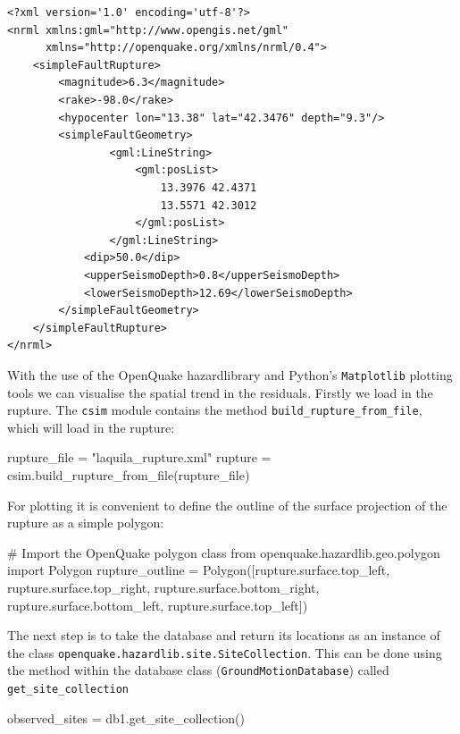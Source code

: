\begin{verbatim}
<?xml version='1.0' encoding='utf-8'?>
<nrml xmlns:gml="http://www.opengis.net/gml"
      xmlns="http://openquake.org/xmlns/nrml/0.4">
    <simpleFaultRupture>
        <magnitude>6.3</magnitude>
        <rake>-98.0</rake>
        <hypocenter lon="13.38" lat="42.3476" depth="9.3"/>
        <simpleFaultGeometry>
                <gml:LineString>
                    <gml:posList>
                        13.3976 42.4371
                        13.5571 42.3012
                    </gml:posList>
                </gml:LineString>
            <dip>50.0</dip>
            <upperSeismoDepth>0.8</upperSeismoDepth>
            <lowerSeismoDepth>12.69</lowerSeismoDepth>
        </simpleFaultGeometry>
    </simpleFaultRupture>
</nrml>
\end{verbatim}

With the use of the OpenQuake hazardlibrary and Python's \verb=Matplotlib= plotting tools we can visualise the spatial trend in the residuals. Firstly we load in the rupture. The \verb=csim= module contains the method \verb=build_rupture_from_file=, which will load in the rupture:

\begin{python}
rupture_file = "laquila_rupture.xml"
rupture = csim.build_rupture_from_file(rupture_file)
\end{python}

For plotting it is convenient to define the outline of the surface projection of the rupture as a simple polygon:

\begin{python}
# Import the OpenQuake polygon class
from openquake.hazardlib.geo.polygon import Polygon
rupture_outline = Polygon([rupture.surface.top_left,
                           rupture.surface.top_right,
                           rupture.surface.bottom_right,
                           rupture.surface.bottom_left,
                           rupture.surface.top_left])
\end{python}

The next step is to take the database and return its locations as an instance of the class \verb=openquake.hazardlib.site.SiteCollection=. This can be done using the method within the database class (\verb=GroundMotionDatabase=) called \verb=get_site_collection=

\begin{python}
observed_sites = db1.get_site_collection()
\end{python}

